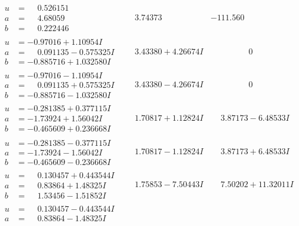 \documentclass[1p]{elsarticle_modified}
\theoremstyle{definition}
\begin{document}
$$\begin{array}{c|c|c}
\begin{aligned}
u &= \phantom{-}0.526151\phantom{ +0.000000I} \\
a &= \phantom{-}4.68059\phantom{ +0.000000I} \\
b &= \phantom{-}0.222446\phantom{ +0.000000I}\end{aligned}
 & \phantom{-}3.74373\phantom{ +0.000000I} & -111.560\phantom{ +0.000000I} \\ \hline\begin{aligned}
u &= -0.97016 + 1.10954 I \\
a &= \phantom{-}0.091135 - 0.575325 I \\
b &= -0.885716 + 1.032580 I\end{aligned}
 & \phantom{-}3.43380 + 4.26674 I & \phantom{-0.000000 } 0 \\ \hline\begin{aligned}
u &= -0.97016 - 1.10954 I \\
a &= \phantom{-}0.091135 + 0.575325 I \\
b &= -0.885716 - 1.032580 I\end{aligned}
 & \phantom{-}3.43380 - 4.26674 I & \phantom{-0.000000 } 0 \\ \hline\begin{aligned}
u &= -0.281385 + 0.377115 I \\
a &= -1.73924 + 1.56042 I \\
b &= -0.465609 + 0.236668 I\end{aligned}
 & \phantom{-}1.70817 + 1.12824 I & \phantom{-}3.87173 - 6.48533 I \\ \hline\begin{aligned}
u &= -0.281385 - 0.377115 I \\
a &= -1.73924 - 1.56042 I \\
b &= -0.465609 - 0.236668 I\end{aligned}
 & \phantom{-}1.70817 - 1.12824 I & \phantom{-}3.87173 + 6.48533 I \\ \hline\begin{aligned}
u &= \phantom{-}0.130457 + 0.443544 I \\
a &= \phantom{-}0.83864 + 1.48325 I \\
b &= \phantom{-}1.53456 - 1.51852 I\end{aligned}
 & \phantom{-}1.75853 - 7.50443 I & \phantom{-}7.50202 + 11.32011 I \\ \hline\begin{aligned}
u &= \phantom{-}0.130457 - 0.443544 I \\
a &= \phantom{-}0.83864 - 1.48325 I \\

\end{aligned}
\end{array}$$
\end{document}
